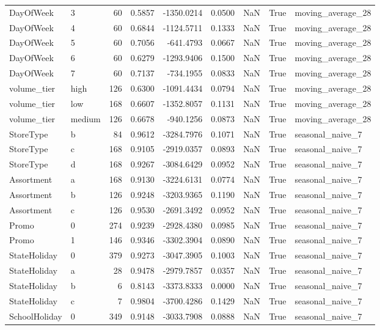 \begin{table}
\begin{tabular}{llrrrrrrl}
DayOfWeek & 3 & 60 & 0.5857 & -1350.0214 & 0.0500 & NaN & True & moving\_average\_28 \\
DayOfWeek & 4 & 60 & 0.6844 & -1124.5711 & 0.1333 & NaN & True & moving\_average\_28 \\
DayOfWeek & 5 & 60 & 0.7056 & -641.4793 & 0.0667 & NaN & True & moving\_average\_28 \\
DayOfWeek & 6 & 60 & 0.6279 & -1293.9406 & 0.1500 & NaN & True & moving\_average\_28 \\
DayOfWeek & 7 & 60 & 0.7137 & -734.1955 & 0.0833 & NaN & True & moving\_average\_28 \\
volume\_tier & high & 126 & 0.6300 & -1091.4434 & 0.0794 & NaN & True & moving\_average\_28 \\
volume\_tier & low & 168 & 0.6607 & -1352.8057 & 0.1131 & NaN & True & moving\_average\_28 \\
volume\_tier & medium & 126 & 0.6678 & -940.1256 & 0.0873 & NaN & True & moving\_average\_28 \\
StoreType & b & 84 & 0.9612 & -3284.7976 & 0.1071 & NaN & True & seasonal\_naive\_7 \\
StoreType & c & 168 & 0.9105 & -2919.0357 & 0.0893 & NaN & True & seasonal\_naive\_7 \\
StoreType & d & 168 & 0.9267 & -3084.6429 & 0.0952 & NaN & True & seasonal\_naive\_7 \\
Assortment & a & 168 & 0.9130 & -3224.6131 & 0.0774 & NaN & True & seasonal\_naive\_7 \\
Assortment & b & 126 & 0.9248 & -3203.9365 & 0.1190 & NaN & True & seasonal\_naive\_7 \\
Assortment & c & 126 & 0.9530 & -2691.3492 & 0.0952 & NaN & True & seasonal\_naive\_7 \\
Promo & 0 & 274 & 0.9239 & -2928.4380 & 0.0985 & NaN & True & seasonal\_naive\_7 \\
Promo & 1 & 146 & 0.9346 & -3302.3904 & 0.0890 & NaN & True & seasonal\_naive\_7 \\
StateHoliday & 0 & 379 & 0.9273 & -3047.3905 & 0.1003 & NaN & True & seasonal\_naive\_7 \\
StateHoliday & a & 28 & 0.9478 & -2979.7857 & 0.0357 & NaN & True & seasonal\_naive\_7 \\
StateHoliday & b & 6 & 0.8143 & -3373.8333 & 0.0000 & NaN & True & seasonal\_naive\_7 \\
StateHoliday & c & 7 & 0.9804 & -3700.4286 & 0.1429 & NaN & True & seasonal\_naive\_7 \\
SchoolHoliday & 0 & 349 & 0.9148 & -3033.7908 & 0.0888 & NaN & True & seasonal\_naive\_7 \\

\end{tabular}
\end{table}
